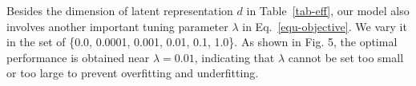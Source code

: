 Besides the dimension of latent representation $d$ in Table~\ref{tab-eff}, our model also involves another important tuning parameter $\lambda$ in Eq.~\ref{equ-objective}.  We vary it in the set of  \{0.0, 0.0001, 0.001, 0.01, 0.1, 1.0\}. As shown in Fig. 5, the optimal performance is obtained near $\lambda = 0.01$, indicating that  $\lambda$ cannot be set too small or too large to prevent overfitting and underfitting.






